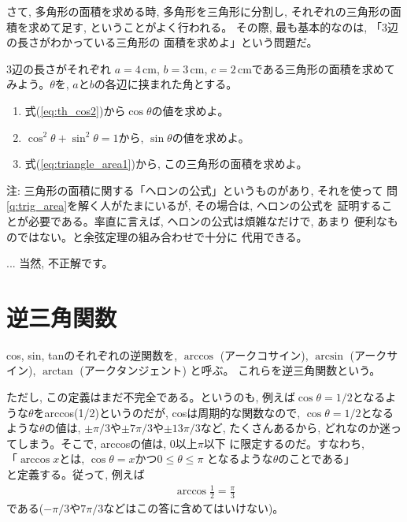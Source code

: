 さて, 多角形の面積を求める時, 多角形を三角形に分割し, 
それぞれの三角形の面積を求めて足す, ということがよく行われる。
その際, 最も基本的なのは, 「3辺の長さがわかっている三角形の
面積を求めよ」という問題だ。

\begin{q}\label{q:trig_area} 3辺の長さがそれぞれ
$a=4\,$cm, $b=3\,$cm, $c=2\,$cmである三角形の面積を求めてみよう。$\theta$を, $a$と$b$の各辺に挟まれた角とする。
\begin{enumerate}
\item 式(\ref{eq:th_cos2})から$\cos\theta$の値を求めよ。
\item $\cos^2\theta+\sin^2\theta=1$から, $\sin\theta$の値を求めよ。
\item 式(\ref{eq:triangle_area1})から, この三角形の面積を求めよ。
\end{enumerate}\end{q}

{\small 注: 三角形の面積に関する「ヘロンの公式」というものがあり, それを使って
問\ref{q:trig_area}を解く人がたまにいるが, その場合は, ヘロンの公式を
証明することが必要である。率直に言えば, ヘロンの公式は煩雑なだけで, あまり
便利なものではない。と余弦定理の組み合わせで十分に
代用できる。}

\begin{freqmiss}{\small{} ... 
当然, 不正解です。}\end{freqmiss}
\vv



\section{逆三角関数}\label{sec:arcsin}

cos, sin, tanのそれぞれの逆関数を, 
$\arccos$ (アークコサイン), 
$\arcsin$ (アークサイン), 
$\arctan$ (アークタンジェント)
と呼ぶ。 これらを逆三角関数という。\hv

ただし, この定義はまだ不完全である。というのも, 
例えば$\cos \theta=1/2$となるような$\theta$をarccos(1/2)というのだが, 
cosは周期的な関数なので, $\cos \theta=1/2$となるような$\theta$の値は, 
$\pm\pi/3$や$\pm7\pi/3$や$\pm13\pi/3$など, たくさんあるから, 
どれなのか迷ってしまう。そこで, arccosの値は, $0$以上$\pi$以下
に限定するのだ。すなわち, \\
「$\arccos x$とは, $\cos \theta=x$かつ$0\leq\theta\leq\pi$
となるような$\theta$のことである」\\
と定義する。従って, 例えば
\begin{eqnarray}
\arccos\frac{1}{2}=\frac{\pi}{3}
\end{eqnarray}
である($-\pi/3$や$7\pi/3$などはこの答に含めてはいけない)。

